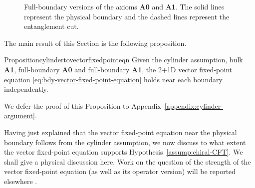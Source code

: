 \documentclass[12pt, nofootinbib]{article}
\theoremstyle{plain}
\theoremstyle{assumption}
\theoremstyle{definition}
\theoremstyle{plain}
\theoremstyle{plain}
\theoremstyle{plain}
\theoremstyle{plain}
\theoremstyle{plain}
\begin{document}
\begin{figure}[t]
    \centering
    \caption{Full-boundary versions of the axioms \textbf{A0} and \textbf{A1}. The solid lines represent the physical boundary and the dashed lines represent the entanglement cut.}
    \label{fig:full_boundary_axioms}
\end{figure}

The main result of this Section is the following proposition.
\begin{restatable}{Proposition}{cylindertovectorfixedpointeqn}\label{prop:cylinder-to-vector-fixed-point-eqn}
Given the cylinder assumption, bulk {\bf A1}, full-boundary {\bf A0} and full-boundary {\bf A1}, 
the 2+1D vector fixed-point equation 
\eqref{eq:bdy-vector-fixed-point-equation}
holds near each boundary independently.   
\end{restatable}
\noindent
We defer the proof of this Proposition to Appendix~\ref{appendix:cylinder-argument}.

Having just explained that the vector fixed-point equation near the physical boundary follows from the cylinder assumption, we now discuss to what extent the vector fixed-point equation supports Hypothesis~\ref{assump:chiral-CFT}. We shall give a physical discussion here. Work on the question of the strength of the vector fixed-point equation (as well as its operator version) will be reported elsewhere \cite{strength-of-FPE}.
\end{document}
